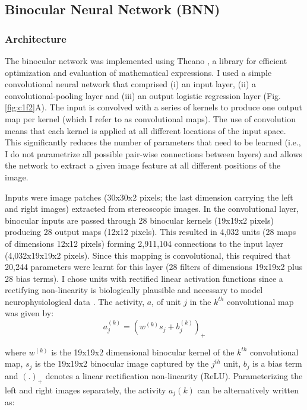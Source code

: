 \subsection*{Binocular Neural Network (BNN)}

\subsubsection*{Architecture}

The binocular network was implemented using Theano \cite{2016arXiv160502688T}, a library for efficient optimization and evaluation of mathematical expressions. I used a simple convolutional neural network that comprised (i) an input layer, (ii) a convolutional-pooling layer and (iii) an output logistic regression layer (Fig. \ref{fig:c1f2}A). The input is convolved with a series of kernels to produce one output map per kernel (which I refer to as convolutional maps). The use of convolution means that each kernel is applied at all different locations of the input space. This significantly reduces the number of parameters that need to be learned (i.e., I do not parametrize all possible pair-wise connections between layers) and allows the network to extract a given image feature at all different positions of the image. 

Inputs were image patches (30x30x2 pixels; the last dimension carrying the left and right images) extracted from stereoscopic images. In the convolutional layer, binocular inputs are passed through 28 binocular kernels (19x19x2 pixels) producing 28 output maps (12x12 pixels). This resulted in 4,032 units (28 maps of dimensions 12x12 pixels) forming 2,911,104 connections to the input layer (4,032x19x19x2 pixels). Since this mapping is convolutional, this required that 20,244 parameters were learnt for this layer (28 filters of dimensions 19x19x2 plus 28 bias terms). I chose units with rectified linear activation functions since a rectifying non-linearity is biologically plausible and necessary to model neurophysiological data \cite{Movshon:1978dq}. The activity, $a$, of unit $j$ in the $k^{th}$ convolutional map was given by:
\begin{equation}
  a_j^{(k)}=(w^{(k)}s_j + b_j^{(k)} )_+
\end{equation}

where $w^{(k)}$ is the 19x19x2 dimensional binocular kernel of the $k^{th}$ convolutional map, $s_j$ is the 19x19x2 binocular image captured by the $j^{th}$ unit, $b_j$ is a bias term and $(.)_+$ denotes a linear rectification non-linearity (ReLU). Parameterizing the left and right images separately, the activity $a_j{(k)}$ can be alternatively written as:

